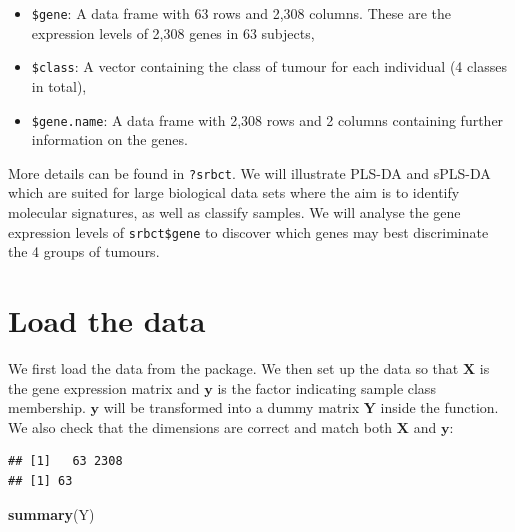 \documentclass[]{book}
\newenvironment{Shaded}{\begin{snugshade}}{\end{snugshade}}
\newcommand{\KeywordTok}[1]{\textcolor[rgb]{0.13,0.29,0.53}{\textbf{#1}}}
\newcommand{\StringTok}[1]{\textcolor[rgb]{0.31,0.60,0.02}{#1}}
\newcommand{\CommentTok}[1]{\textcolor[rgb]{0.56,0.35,0.01}{\textit{#1}}}
\newcommand{\OperatorTok}[1]{\textcolor[rgb]{0.81,0.36,0.00}{\textbf{#1}}}
\newcommand{\NormalTok}[1]{#1}
\begin{document}
\begin{itemize}
\item
  \texttt{\$gene}: A data frame with 63 rows and 2,308 columns. These
  are the expression levels of 2,308 genes in 63 subjects,
\item
  \texttt{\$class}: A vector containing the class of tumour for each
  individual (4 classes in total),
\item
  \texttt{\$gene.name}: A data frame with 2,308 rows and 2 columns
  containing further information on the genes.
\end{itemize}

More details can be found in \texttt{?srbct}. We will illustrate PLS-DA
and sPLS-DA which are suited for large biological data sets where the
aim is to identify molecular signatures, as well as classify samples. We
will analyse the gene expression levels of \texttt{srbct\$gene} to
discover which genes may best discriminate the 4 groups of tumours.

\section{Load the data}\label{plsda:load}

We first load the data from the package. We then set up the data so that
\(\boldsymbol X\) is the gene expression matrix and \(\boldsymbol y\) is
the factor indicating sample class membership. \(\boldsymbol y\) will be
transformed into a dummy matrix \(\boldsymbol Y\) inside the function.
We also check that the dimensions are correct and match both
\(\boldsymbol X\) and \(\boldsymbol y\):

\begin{Shaded}
\end{Shaded}

\begin{verbatim}
## [1]   63 2308
## [1] 63
\end{verbatim}

\begin{Shaded}
\begin{Highlighting}[]
\KeywordTok{summary}\NormalTok{(Y)}
\end{Highlighting}
\end{Shaded}
\end{document}
